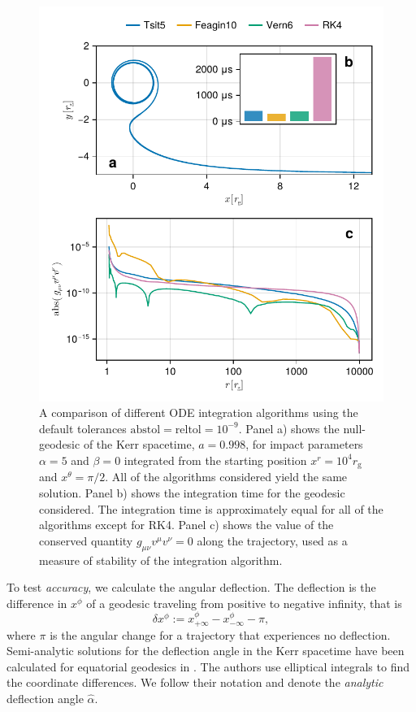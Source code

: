 \documentclass[fleqn,usenatbib]{mnras}
\newcommand{\rg}{r_\text{g}}
\begin{document}
\begin{figure}
	\centering
	\includegraphics[width=0.95\linewidth]{figures/stability.conservation.pdf}
	\caption{A comparison of different ODE integration algorithms using the default
    tolerances $\text{abstol} = \text{reltol} = 10^{-9}$. Panel a) shows the
    null-geodesic of the Kerr spacetime, $a = 0.998$, for impact parameters
    $\alpha = 5$ and $\beta = 0$ integrated from the starting position $x^r =
    10^4 \rg$ and $x^\theta = \pi / 2$. All of the algorithms considered
    yield the same solution. Panel b) shows the integration time for the
    geodesic considered. The integration time is approximately equal for all of
    the algorithms except for RK4. Panel c) shows the value of the conserved
    quantity $g_{\mu \nu} v^\mu v^\nu = 0$ along the trajectory, used as a
    measure of stability of the integration algorithm.
}
	\label{fig:dot-stability}
\end{figure}

To test \emph{accuracy}, we calculate the angular deflection. The deflection is
the difference in $x^\phi$ of a geodesic traveling from positive to negative
infinity, that is
\begin{equation}
	\delta x^\phi :=
		x^\phi_{+\infty} - x^\phi_{-\infty}
		- \pi,
\end{equation}
where $\pi$ is the angular change for a trajectory that experiences no
deflection. Semi-analytic solutions for the deflection angle in the Kerr
spacetime have been calculated for equatorial geodesics in
\cite{iyer_lights_2009}. The authors use elliptical integrals to find the
coordinate differences. We follow their notation and denote the \emph{analytic}
deflection angle $\hat{\alpha}$.
\end{document}
